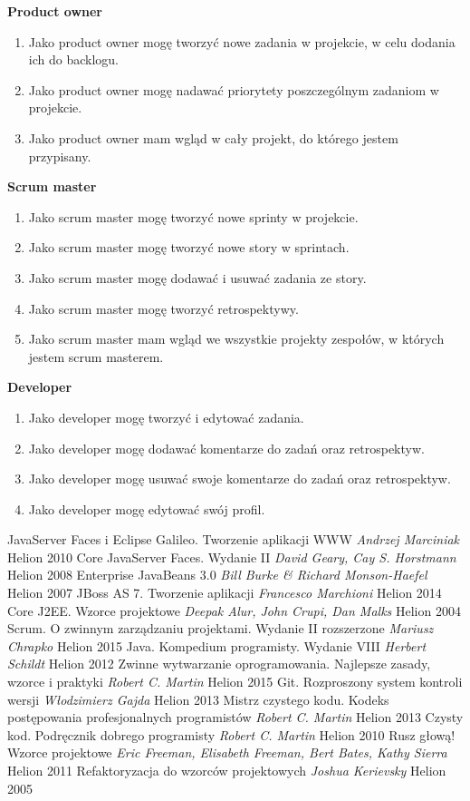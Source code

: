 	\textbf{Product owner}
	\begin{enumerate}		
		\item Jako product owner mogę tworzyć nowe zadania w projekcie, w celu dodania ich do backlogu.
		\item Jako product owner mogę nadawać priorytety poszczególnym zadaniom w projekcie.
		\item Jako product owner mam wgląd w cały projekt, do którego jestem przypisany.
	\end{enumerate}	
	\textbf{Scrum master}
	\begin{enumerate}		
		\item Jako scrum master mogę tworzyć nowe sprinty w projekcie.
		\item Jako scrum master mogę tworzyć nowe story w sprintach.
		\item Jako scrum master mogę dodawać i usuwać zadania ze story.
		\item Jako scrum master mogę tworzyć retrospektywy.
		\item Jako scrum master mam wgląd we wszystkie projekty zespołów, w których jestem scrum masterem.
	\end{enumerate}
	\textbf{Developer}
	\begin{enumerate}		
		\item Jako developer mogę tworzyć i edytować zadania.
		\item Jako developer mogę dodawać komentarze do zadań oraz retrospektyw.
		\item Jako developer mogę usuwać swoje komentarze do zadań oraz retrospektyw.
		\item Jako developer mogę edytować swój profil.
	\end{enumerate}
	

\newpage
\begin{thebibliography}{99}
	 JavaServer Faces i Eclipse Galileo. Tworzenie aplikacji WWW \emph{Andrzej Marciniak} Helion 2010
	 Core JavaServer Faces. Wydanie II \emph{David Geary, Cay S. Horstmann} Helion 2008
	 Enterprise JavaBeans 3.0 \emph{Bill Burke \& Richard Monson-Haefel} Helion 2007
	 JBoss AS 7. Tworzenie aplikacji \emph{Francesco Marchioni} Helion 2014
	 Core J2EE. Wzorce projektowe \emph{Deepak Alur, John Crupi, Dan Malks} Helion 2004
	 Scrum. O zwinnym zarządzaniu projektami. Wydanie II rozszerzone \emph{Mariusz Chrapko} Helion 2015
	 Java. Kompedium programisty. Wydanie VIII \emph{Herbert Schildt} Helion 2012
	 Zwinne wytwarzanie oprogramowania. Najlepsze zasady, wzorce i praktyki \emph{Robert C. Martin} Helion 2015
	 Git. Rozproszony system kontroli wersji \emph{Włodzimierz Gajda} Helion 2013
	 Mistrz czystego kodu. Kodeks postępowania profesjonalnych programistów \emph{Robert C. Martin} Helion 2013
	 Czysty kod. Podręcznik dobrego programisty \emph{Robert C. Martin} Helion 2010
	 Rusz głową! Wzorce projektowe \emph{Eric Freeman, Elisabeth Freeman, Bert Bates, Kathy Sierra} Helion 2011
	 Refaktoryzacja do wzorców projektowych \emph{Joshua Kerievsky} Helion 2005	
\end{thebibliography}

